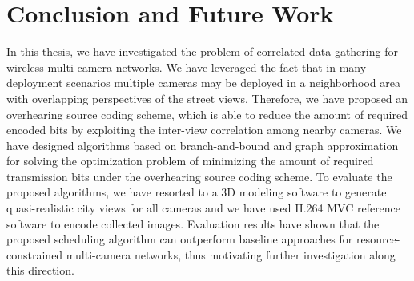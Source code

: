 \chapter{Conclusion and Future Work}
\label{sec::conclusion}
In this thesis, we have investigated the problem of correlated data gathering for wireless multi-camera networks.
We have leveraged the fact that in many deployment scenarios multiple cameras may be deployed in a neighborhood area with overlapping perspectives of the street views.
Therefore, we have proposed an overhearing source coding scheme, which is able to reduce the amount of required encoded bits by exploiting the inter-view correlation among nearby cameras. 
We have designed algorithms based on branch-and-bound and graph approximation for solving the optimization problem of minimizing the amount of required transmission bits under the overhearing source coding scheme.
To evaluate the proposed algorithms, we have resorted to a 3D modeling software to generate quasi-realistic city views for all cameras and we have used H.264 MVC reference software to encode collected images.
Evaluation results have shown that the proposed scheduling algorithm can outperform baseline approaches for resource-constrained multi-camera networks, thus motivating further investigation along this direction.